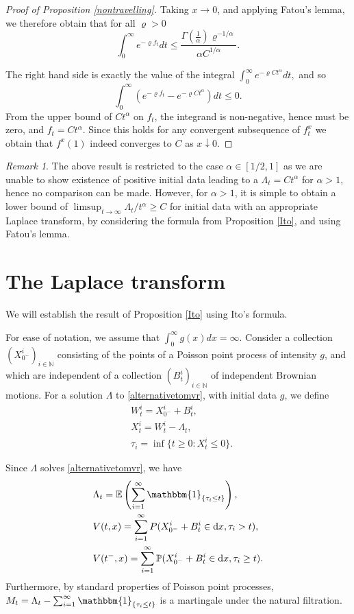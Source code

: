 \documentclass[11pt]{article}
\theoremstyle{plain}
\theoremstyle{remark}
\newtheorem{remark}[theorem]{Remark}
\theoremstyle{definition}
\numberwithin{equation}{section}
\begin{document}
\begin{proof}[Proof of Proposition \ref{nontravelling}]
    Taking $x\rightarrow 0$, and applying Fatou's lemma, we therefore obtain that
    for all $\varrho>0$
    $$\int_0^\infty e^{-\varrho f_t}dt\leq \frac{\Gamma(\frac{1}{\alpha})\varrho^{-1/\alpha}}{\alpha C^{1/\alpha}}.$$

    The right hand side is exactly the value of the integral
    $\int_0^\infty e^{-\varrho Ct^\alpha}dt,$ and so
    $$\int_0^\infty \left(e^{-\varrho f_t}-e^{-\varrho Ct^\alpha}\right)dt\leq 0.$$
    From the upper bound of $Ct^\alpha$ on $f_t$, the integrand is non-negative, hence must be zero, and $f_t=Ct^\alpha$. Since this holds for any convergent subsequence of $f_t^x$ we obtain that $f^x(1)$ indeed converges to $C$ as $x\downarrow0.$
\end{proof}

\begin{remark}
The above result is restricted to the case $\alpha\in [1/2,1]$ as we are unable to show existence of positive initial data leading to a $\Lambda_t=Ct^\alpha$  for $\alpha>1$, hence no comparison can be made. However, for $\alpha>1$, it is simple to obtain a lower bound of $\limsup_{t\rightarrow\infty}\Lambda_t/t^{\alpha}\geq C$ for initial data with an appropriate Laplace transform, by considering the formula from Proposition \ref{Ito}, and using Fatou's lemma.
\end{remark}

\section{The Laplace transform}
\label{itoformula}
We will establish the result of Proposition \ref{Ito} using Ito's formula.

For ease of notation, we assume that $\int_0^\infty g(x)dx=\infty$. Consider a collection $(X_{0^-}^i)_{i\in\mathbb{N}}$ consisting of the points of a Poisson point process of intensity $g$, and which are independent of a collection $(B_t^i)_{i\in\mathbb{N}}$ of independent Brownian motions. For a solution $\Lambda$ to \eqref{alternativetomvr}, with initial data $g$, we define
\begin{align}
   &W_t^i=X_{0^-}^i+B_t^i,\nonumber\\
   &X_t^i=W_t^i-\Lambda_t,\label{aligned:MVR}\\
   &\tau_i=\inf\{t\geq0:X_t^i\leq 0\}.\nonumber
\end{align}

Since $\Lambda$ solves \eqref{alternativetomvr}, we have
\begin{align*}&\Lambda_t=\mathbb{E}\left(\sum_{i=1}^\infty\mathbbm{1}_{\{\tau_i\leq t\}}\right),\\
&V(t,x)=\sum_{i=1}^\infty P(X_{0^-}^i+B_t^i\in \textrm{d}x,\tau_i>t),\\&V(t^-,x)=\sum_{i=1}^\infty\mathbb{P}(X_{0^-}^i+B_t^i\in \textrm{d}x,\tau_i\geq t).\end{align*}
Furthermore, by standard properties of Poisson point processes, $M_t=\Lambda_t-\sum_{i=1}^\infty\mathbbm{1}_{\{\tau_i\leq t\}}$ is a martingale under the natural filtration. 
\end{document}

